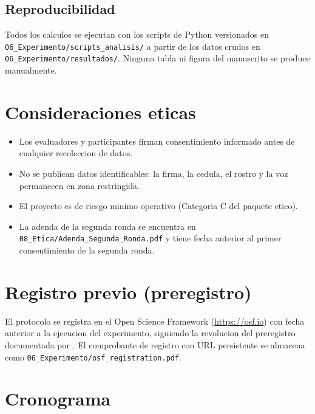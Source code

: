 \documentclass[12pt,a4paper]{article}
\begin{document}
\subsection{Reproducibilidad}
Todos los calculos se ejecutan con los scripts de Python versionados en
\texttt{06\_Experimento/scripts\_analisis/} a partir de los datos crudos en
\texttt{06\_Experimento/resultados/}. Ninguna tabla ni figura del manuscrito se
produce manualmente.

\section{Consideraciones eticas}

\begin{itemize}
    \item Los evaluadores y participantes firman consentimiento informado antes
    de cualquier recoleccion de datos.
    \item No se publican datos identificables: la firma, la cedula, el rostro y
    la voz permanecen en zona restringida.
    \item El proyecto es de riesgo minimo operativo (Categoria C del paquete
    etico).
    \item La adenda de la segunda ronda se encuentra en
    \texttt{08\_Etica/Adenda\_Segunda\_Ronda.pdf} y tiene fecha anterior al
    primer consentimiento de la segunda ronda.
\end{itemize}

\section{Registro previo (preregistro)}

El protocolo se registra en el Open Science Framework (\url{https://osf.io})
con fecha anterior a la ejecucion del experimento, siguiendo la revolucion del
preregistro documentada por \cite{nosek2018}. El comprobante de registro con
URL persistente se almacena como \texttt{06\_Experimento/osf\_registration.pdf}.

\section{Cronograma}
\end{document}

